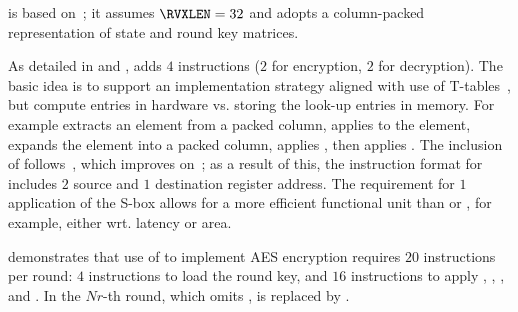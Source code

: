 
is based on~\cite{NadIkeKur:04,BBFR:06,Saarinen:20}; it
assumes 
$\RVXLEN = 32$
and adopts a 
column-packed 
representation of state and round key matrices.

As detailed in
and
,
adds
$ 4$
instructions ($2$ for encryption, $2$ for decryption).
The basic idea is to support an implementation strategy aligned with use
of 
T-tables~\cite[Section 4.2]{DaeRij:02}, 
but compute entries in hardware vs. storing the look-up entries in memory.
For example
extracts                     an     element from a packed column,
 applies   to the element,
 expands                        the element into a packed column,
 applies ,
then
 applies .
The inclusion of  follows~\cite{Saarinen:20}, which
improves on~\cite{NadIkeKur:04,BBFR:06}; as a result of this,
the instruction format for
includes $2$ source and $1$ destination register address.
The requirement for $1$ application of the S-box allows for a more efficient 
functional unit than  or , for example, either wrt. latency or 
area.

demonstrates that use of  to implement AES encryption requires
$20$ instructions per round:
$ 4$            
     instructions to load the round key,
and
$16$  
     instructions to apply , , , and .
In the $Nr$-th round, which omits ,
is replaced by 
     .

